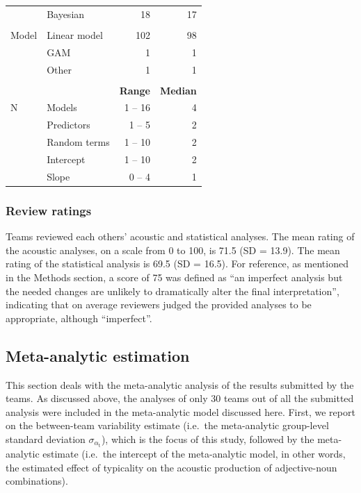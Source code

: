 \documentclass[Review,times,sageh]{sagej}
\begin{document}
\begin{table}
{\begin{tabular}[t]{llrr}
 & Bayesian & 18 & 17\\
 &  &  \vphantom{1} & \\
\hspace{1em}Model & Linear model & 102 & 98\\
 & GAM & 1 & 1\\
 & Other & 1 & 1\\
 &  &  & \\
 &  & \bf{Range} & \bf{Median}\\
\hspace{1em}N & Models & 1 -- 16 & 4\\
 & Predictors & 1 -- 5 & 2\\
 & Random terms & 1 -- 10 & 2\\
\hspace{1em} & \hspace{1em}Intercept & \hspace{1em}1 -- 10 & \hspace{1em}2\\
\hspace{1em} & \hspace{1em}Slope & \hspace{1em}0 -- 4 & \hspace{1em}1\\
\bottomrule
\end{tabular}}
\end{table}

\hypertarget{review-ratings}{%
\subsubsection{Review ratings}\label{review-ratings}}

Teams reviewed each others' acoustic and statistical analyses.
The mean rating of the acoustic analyses, on a scale from 0 to 100, is 71.5 (SD = 13.9).
The mean rating of the statistical analysis is 69.5 (SD = 16.5).
For reference, as mentioned in the Methods section, a score of 75 was defined as ``an imperfect analysis but the needed changes are unlikely to dramatically alter the final interpretation'', indicating that on average reviewers judged the provided analyses to be appropriate, although ``imperfect''.

\hypertarget{meta-est-2}{%
\subsection{Meta-analytic estimation}\label{meta-est-2}}

This section deals with the meta-analytic analysis of the results submitted by the teams.
As discussed above, the analyses of only 30 teams out of all the submitted analysis were included in the meta-analytic model discussed here.
First, we report on the between-team variability estimate (i.e.~the meta-analytic group-level standard deviation \(\sigma_{\alpha_{\text{t}}}\)), which is the focus of this study, followed by the meta-analytic estimate (i.e.~the intercept of the meta-analytic model, in other words, the estimated effect of typicality on the acoustic production of adjective-noun combinations).
\end{document}
